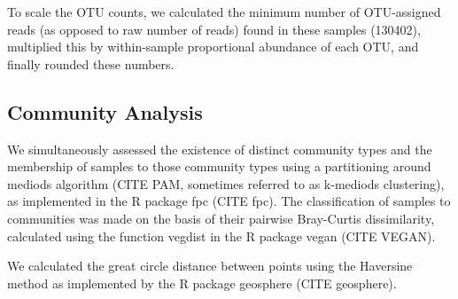 \documentclass[11pt,letterpaper]{article} %
\begin{document}
%
%
%
%
%
%
%


To scale the OTU counts, we calculated the minimum number of OTU-assigned reads (as opposed to raw number of reads) found in these samples (130402), multiplied this by within-sample proportional abundance of each OTU, and finally rounded these numbers.




\subsection*{Community Analysis}
We simultaneously assessed the existence of distinct community types and the membership of samples to those community types using a partitioning around mediods algorithm (CITE PAM, sometimes referred to as k-mediods clustering), as implemented in the R package fpc (CITE fpc).
The classification of samples to communities was made on the basis of their pairwise Bray-Curtis dissimilarity, calculated using the function vegdist in the R package vegan (CITE VEGAN). %

We calculated the great circle distance between points using the Haversine method as implemented by the R package geosphere (CITE geosphere).
\end{document}
